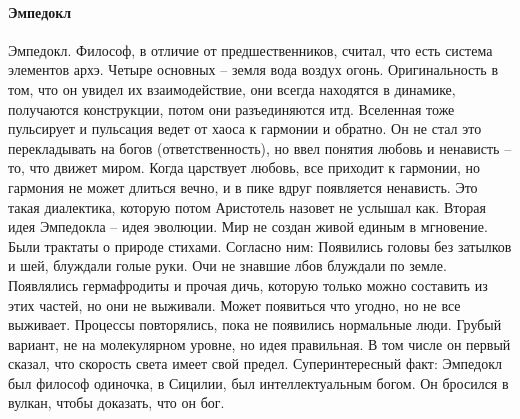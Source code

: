 \documentclass[a4paper, 12pt]{article}
\begin{document}
\paragraph{Эмпедокл}
Эмпедокл. Философ, в отличие от предшественников, считал, что есть система элементов архэ. Четыре основных -- земля вода воздух огонь. Оригинальность в том, что он увидел их взаимодействие, они всегда находятся в динамике, получаются конструкции, потом они разъединяются итд. Вселенная тоже пульсирует и пульсация ведет от хаоса к гармонии и обратно. Он не стал это перекладывать на богов (ответственность), но ввел понятия любовь и ненависть -- то, что движет миром. Когда царствует любовь, все приходит к гармонии, но гармония не может длиться вечно, и в пике вдруг появляется ненависть. Это такая диалектика, которую потом Аристотель назовет не услышал как. Вторая идея Эмпедокла -- идея эволюции. Мир не создан живой единым в мгновение. Были трактаты о природе стихами. Согласно ним: Появились головы без затылков и шей, блуждали голые руки. Очи не знавшие лбов блуждали по земле. Появлялись гермафродиты и прочая дичь, которую только можно составить из этих частей, но они не выживали. Может появиться что угодно, но не все выживает. Процессы повторялись, пока не появились нормальные люди. Грубый вариант, не на молекулярном уровне, но идея правильная. В том числе он первый сказал, что скорость света имеет свой предел. Суперинтересный факт: Эмпедокл был философ одиночка, в Сицилии, был интеллектуальным богом. Он бросился в вулкан, чтобы доказать, что он бог. 
\end{document}
